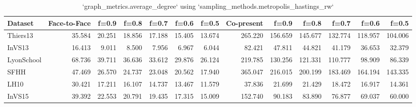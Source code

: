 \begin{table}[ht]
\begin{tabular}{lrrrrrrrrrrrr}
\hline
 Dataset    &   Face-to-Face &   f=0.9 &   f=0.8 &   f=0.7 &   f=0.6 &   f=0.5 &   Co-present &   f=0.9 &   f=0.8 &   f=0.7 &   f=0.6 &   f=0.5 \\
\hline
 Thiers13   &         35.584 &  20.251 &  18.856 &  17.188 &  15.405 &  13.674 &      265.220 & 156.659 & 145.677 & 132.774 & 118.957 & 104.006 \\
 InVS13     &         16.413 &   9.011 &   8.500 &   7.956 &   6.967 &   6.044 &       82.421 &  47.811 &  44.821 &  41.179 &  36.653 &  32.379 \\
 LyonSchool &         68.736 &  39.711 &  36.636 &  33.612 &  29.876 &  26.124 &      219.785 & 130.256 & 121.331 & 110.777 &  98.909 &  86.339 \\
 SFHH       &         47.469 &  26.570 &  24.737 &  23.048 &  20.562 &  17.940 &      365.047 & 216.015 & 200.199 & 183.469 & 164.194 & 143.335 \\
 LH10       &         30.421 &  17.211 &  16.107 &  14.737 &  13.467 &  11.579 &       37.836 &  21.699 &  21.429 &  18.472 &  16.917 &  14.361 \\
 InVS15     &         39.392 &  22.553 &  20.791 &  19.435 &  17.315 &  15.009 &      152.740 &  90.183 &  83.890 &  76.877 &  69.037 &  60.000 \\
\hline
\end{tabular}
\caption{`graph_metrics.average_degree` using `sampling_methods.metropolis_hastings_rw`}
\end{table}